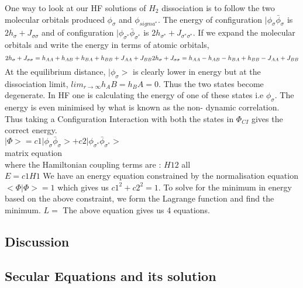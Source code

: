 \documentclass[11pt]{article}   	%
\begin{document}
	One way to look at our HF solutions of $H_2$ dissociation is to follow the two molecular orbitals produced $\phi_{\sigma}$ and $\phi_{sigma^*}$. 
	The energy of configuration $|\phi_{\sigma} \bar{\phi}_{\sigma}$ is $2h_{\sigma} +J_{\sigma \sigma}$ and of configuration 
	$|\phi_{\sigma^*} \bar{\phi}_{\sigma^*}$ is $2h_{\sigma^*} +J_{\sigma^* \sigma^*}$. If we expand the molecular orbitals and 
	write the energy in terms of atomic orbitals, \\
	\begin{equation}
	2h_{\sigma} +J_{\sigma \sigma}=h_{AA}+h_{AB}+h_{BA}+h_{BB}+J_{AA}+J_{BB}\\
	2h_{\sigma} +J_{\sigma \sigma}=h_{AA}-h_{AB}-h_{BA}+h_{BB}-J_{AA}+J_{BB}\\
	\end{equation}
	At the equilibrium distance, $|\phi_{\sigma}>$ is clearly lower in energy but at the dissociation limit, $lim_{r\rightarrow\infty} h_AB=h_BA=0$. Thus the two states
	become degenerate. In HF one is calculating the energy of one of these states i.e $\phi_{\sigma}$. The energy is even minimised by what is known as the non-
	dynamic correlation. Thus taking a Configuration Interaction with both the states in $\Phi_{CI}$ gives the correct energy.\\
	$|\Phi>=c1 |\phi_{\sigma}\bar{\phi}_{\sigma}>+c2|\phi_{\sigma^*}\bar{\phi}_{\sigma^*}>$\\
	matrix equation\\
	where the Hamiltonian coupling terms are :
	$H12$ all \\
	$E=c1H1$
	We have an energy equation constrained by the normalisation equation $<\Phi|\Phi>=1$ which gives us $c1^2+c2^2=1$.
	To solve for the minimum in energy based on the above constraint, we form the Lagrange function and find the minimum. 
	$L=$
	The above equation gives us 4 equations.
	\subsection{Discussion}
	\subsection{Secular Equations and its solution}
\end{document}
